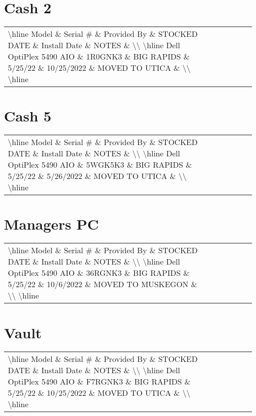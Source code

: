 \documentclass{article}%
\begin{document}
%
\section{Cash 2}%
\label{sec:Cash2}%
\begin{tabularx}{\textwidth}{|X|X|X|X|X|X|X|}%
\textbackslash{}hline%
Model \& Serial \# \& Provided By \& STOCKED DATE \& Install Date \& NOTES \&  \textbackslash{}\textbackslash{}%
\textbackslash{}hline%
Dell OptiPlex 5490 AIO \& 1R0GNK3 \& BIG RAPIDS \& 5/25/22 \& 10/25/2022 \& MOVED TO UTICA  \&  \textbackslash{}\textbackslash{}%
\textbackslash{}hline%
\end{tabularx}

%
\section{Cash 5}%
\label{sec:Cash5}%
\begin{tabularx}{\textwidth}{|X|X|X|X|X|X|X|}%
\textbackslash{}hline%
Model \& Serial \# \& Provided By \& STOCKED DATE \& Install Date \& NOTES \&  \textbackslash{}\textbackslash{}%
\textbackslash{}hline%
Dell OptiPlex 5490 AIO \& 5WGK5K3 \& BIG RAPIDS \& 5/25/22 \& 5/26/2022 \& MOVED TO UTICA  \&  \textbackslash{}\textbackslash{}%
\textbackslash{}hline%
\end{tabularx}

%
\section{Managers PC}%
\label{sec:ManagersPC}%
\begin{tabularx}{\textwidth}{|X|X|X|X|X|X|X|}%
\textbackslash{}hline%
Model \& Serial \# \& Provided By \& STOCKED DATE \& Install Date \& NOTES \&  \textbackslash{}\textbackslash{}%
\textbackslash{}hline%
Dell OptiPlex 5490 AIO \& 36RGNK3 \& BIG RAPIDS \& 5/25/22 \& 10/6/2022 \& MOVED TO MUSKEGON  \&  \textbackslash{}\textbackslash{}%
\textbackslash{}hline%
\end{tabularx}

%
\section{Vault}%
\label{sec:Vault}%
\begin{tabularx}{\textwidth}{|X|X|X|X|X|X|X|}%
\textbackslash{}hline%
Model \& Serial \# \& Provided By \& STOCKED DATE \& Install Date \& NOTES \&  \textbackslash{}\textbackslash{}%
\textbackslash{}hline%
Dell OptiPlex 5490 AIO \& F7RGNK3 \& BIG RAPIDS \& 5/25/22 \& 10/25/2022 \& MOVED TO UTICA  \&  \textbackslash{}\textbackslash{}%
\textbackslash{}hline%
\end{tabularx}
\end{document}
